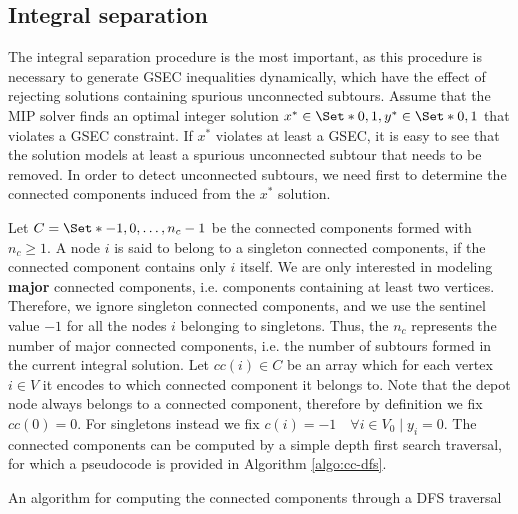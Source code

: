\subsection{Integral separation}
\label{sec:impl-integral-separation}

The integral separation procedure is the most important, as this procedure is necessary to generate GSEC inequalities dynamically, which have the effect of rejecting solutions containing spurious unconnected subtours.
Assume that the MIP solver finds an optimal integer solution $x^* \in \Set*{0, 1}, y^* \in \Set*{0, 1}$ that violates a GSEC constraint.
If $x^*$ violates at least a GSEC, it is easy to see that the solution models at least a spurious unconnected subtour that needs to be removed.
In order to detect unconnected subtours, we need first to determine the connected components induced from the $x^*$ solution.

Let $C = \Set*{-1, 0, \dots, n_c - 1}$ be the connected components formed with $n_c \ge 1$.
A node $i$ is said to belong to a singleton connected components, if the connected component contains only $i$ itself.
We are only interested in modeling \textbf{major} connected components, i.e. components containing at least two vertices.
Therefore, we ignore singleton connected components, and we use the sentinel value $-1$ for all the nodes $i$ belonging to singletons.
Thus, the $n_c$ represents the number of major connected components, i.e. the number of subtours formed in the current integral solution.
Let $cc(i) \in C$ be an array which for each vertex $i \in V$ it encodes to which connected component it belongs to.
Note that the depot node always belongs to a connected component, therefore by definition we fix $cc(0) = 0$.
For singletons instead we fix $c(i) = -1  \quad \forall i \in V_0 \mid y_i = 0$.
The connected components can be computed by a simple depth first search traversal, for which a pseudocode is provided in Algorithm \ref{algo:cc-dfs}.

\begin{algorithm}
	\caption{An algorithm for computing the connected components through a DFS traversal}
	
	\label{algo:cc-dfs}
\end{algorithm}

